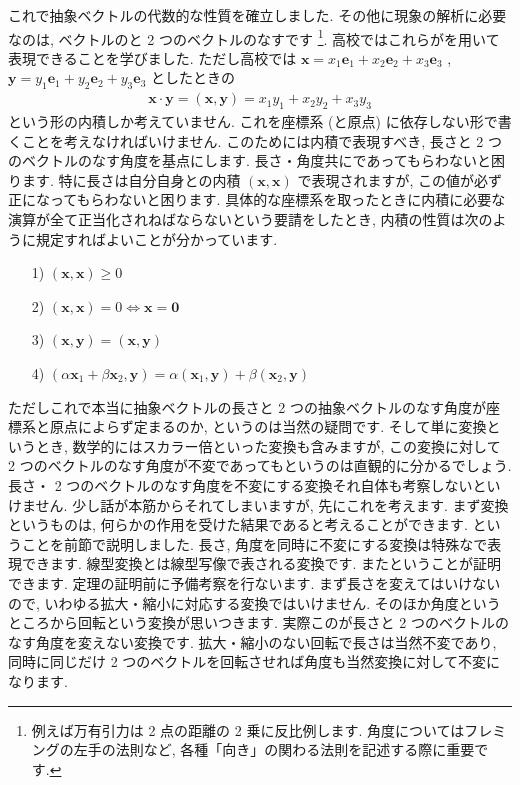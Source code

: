\documentclass[openany, a4paper, oneside]{jsbook}
\begin{document}
これで抽象ベクトルの代数的な性質を確立しました.
その他に現象の解析に必要なのは, ベクトルのと 2 つのベクトルのなすです \footnote{例えば万有引力は 2 点の距離の 2 乗に反比例します.
角度についてはフレミングの左手の法則など, 各種「向き」の関わる法則を記述する際に重要です.}.
高校ではこれらがを用いて表現できることを学びました.
ただし高校では
 $\bm{x} = x_1 \bm{e}_1 + x_2 \bm{e}_2 + x_3 \bm{e}_3$ ,
 $\bm{y} = y_1 \bm{e}_1 + y_2 \bm{e}_2 + y_3 \bm{e}_3$
としたときの
\begin{align}
    \bm{x} \cdot \bm{y}
    = ( \bm{x} , \bm{y} )
    = x_1 y_1 + x_2 y_2 + x_3 y_3
\end{align}
という形の内積しか考えていません.
これを座標系 (と原点) に依存しない形で書くことを考えなければいけません.
このためには内積で表現すべき, 長さと 2 つのベクトルのなす角度を基点にします.
長さ・角度共にであってもらわないと困ります.
特に長さは自分自身との内積 $(\bm{x},\bm{x})$ で表現されますが, この値が必ず正になってもらわないと困ります.
具体的な座標系を取ったときに内積に必要な演算が全て正当化されねばならないという要請をしたとき,
内積の性質は次のように規定すればよいことが分かっています.
\begin{enumerate}
    \item[1)] $( \bm{x} , \bm{x} ) \geq 0$
    \item[2)] $( \bm{x} , \bm{x} ) = 0 \Longleftrightarrow \bm{x} = \bm{0}$
    \item[3)] $( \bm{x} , \bm{y} ) = ( \bm{x} , \bm{y})$
    \item[4)] $(\alpha \bm{x}_1 + \beta \bm{x}_2 , \bm{y} ) = \alpha ( \bm{x}_1 , \bm{y} ) + \beta ( \bm{x}_2 , \bm{y} )$
\end{enumerate}
ただしこれで本当に抽象ベクトルの長さと 2 つの抽象ベクトルのなす角度が座標系と原点によらず定まるのか, というのは当然の疑問です.
そして単に変換というとき, 数学的にはスカラー倍といった変換も含みますが,
この変換に対して 2 つのベクトルのなす角度が不変であってもというのは直観的に分かるでしょう.
長さ・ 2 つのベクトルのなす角度を不変にする変換それ自体も考察しないといけません.
少し話が本筋からそれてしまいますが, 先にこれを考えます.
まず変換というものは, 何らかの作用を受けた結果であると考えることができます.
ということを前節で説明しました.
長さ, 角度を同時に不変にする変換は特殊なで表現できます.
線型変換とは線型写像で表される変換です.
またということが証明できます.
定理の証明前に予備考察を行ないます.
まず長さを変えてはいけないので, いわゆる拡大・縮小に対応する変換ではいけません.
そのほか角度というところから回転という変換が思いつきます.
実際このが長さと 2 つのベクトルのなす角度を変えない変換です.
拡大・縮小のない回転で長さは当然不変であり,
同時に同じだけ 2 つのベクトルを回転させれば角度も当然変換に対して不変になります.
\end{document}
